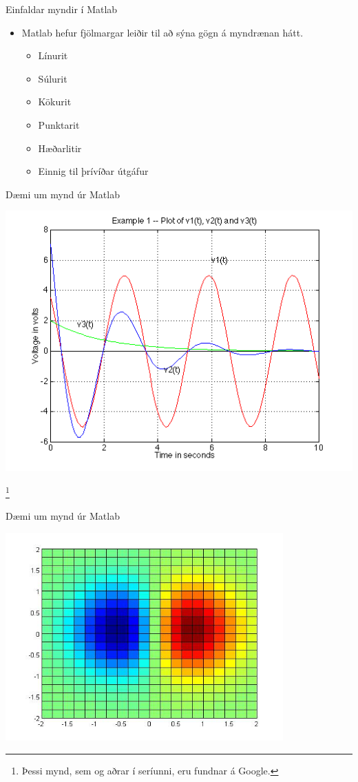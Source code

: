 \documentclass{beamer}
\begin{document}
\begin{frame}{Einfaldar myndir í Matlab}
\begin{itemize}
 \item Matlab hefur fjölmargar leiðir til að sýna gögn á myndrænan hátt.
 \begin{itemize}
  \item Línurit
  \item Súlurit
  \item Kökurit
  \item Punktarit
  \item Hæðarlitir
  \item Einnig til þrívíðar útgáfur
 \end{itemize}
\end{itemize}
\end{frame}

\begin{frame}{Dæmi um mynd úr Matlab}
\vspace{2\baselineskip}
\begin{center}
\includegraphics[height=0.6\textheight]{../Pics/plot-example1}
\end{center}\footnote{Þessi mynd, sem og aðrar í seríunni, eru fundnar á Google.}
\end{frame}

\begin{frame}{Dæmi um mynd úr Matlab}
\begin{center}
\includegraphics[width=0.8\textwidth]{../Pics/plot-example2}
\end{center}
\end{frame}
\end{document}
